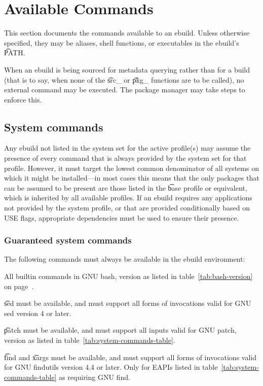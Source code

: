 \section{Available Commands}

This section documents the commands available to an ebuild. Unless otherwise specified, they may be
aliases, shell functions, or executables in the ebuild's \t{PATH}.

When an ebuild is being sourced for metadata querying rather than for a build (that is to say,
when none of the \t{src_} or \t{pkg_} functions are to be called), no external command may
be executed. The package manager may take steps to enforce this.

\subsection{System commands}

Any ebuild not listed in the system set for the active profile(s) may assume the presence of every
command that is always provided by the system set for that profile. However, it must target the
lowest common denominator of all systems on which it might be installed---in most cases this means
that the only packages that can be assumed to be present are those listed in the \t{base} profile or
equivalent, which is inherited by all available profiles. If an ebuild requires any applications not
provided by the system profile, or that are provided conditionally based on USE flags, appropriate
dependencies must be used to ensure their presence.

\subsubsection{Guaranteed system commands}
\label{sec:guaranteed-system-commands}

The following commands must always be available in the ebuild environment:
\begin{compactitem}
\item All builtin commands in GNU bash, version as listed in table~\ref{tab:bash-version} on
    page~\pageref{tab:bash-version}.
\item \t{sed} must be available, and must support all forms of invocations valid for GNU sed
    version 4 or later.
\item {} \t{patch} must be available, and must support all inputs valid
	for GNU patch, version as listed in table~\ref{tab:system-commands-table}.
\item {} \t{find} and \t{xargs} must be available, and must support all forms
    of invocations valid for GNU findutils version 4.4 or later. Only for EAPIs listed in
    table~\ref{tab:system-commands-table} as requiring GNU find.
\end{compactitem}

